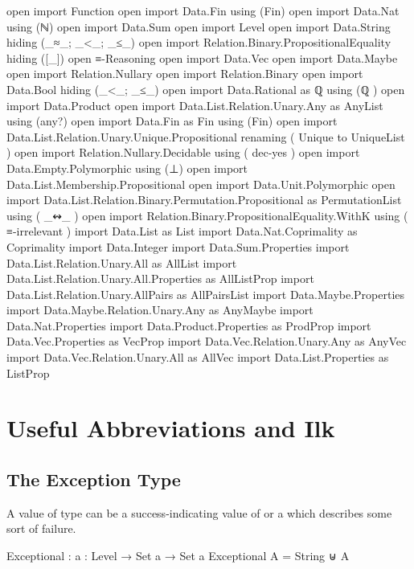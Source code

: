 \documentclass{report}
\begin{document}
\begin{code}
open import Function
open import Data.Fin using (Fin)
open import Data.Nat using (ℕ)
open import Data.Sum
open import Level
open import Data.String hiding (_≈_; _<_; _≤_)
open import Relation.Binary.PropositionalEquality hiding ([_])
open ≡-Reasoning
open import Data.Vec
open import Data.Maybe
open import Relation.Nullary
open import Relation.Binary
open import Data.Bool hiding (_<_; _≤_)
open import Data.Rational
  as ℚ
  using (ℚ
        )
open import Data.Product
open import Data.List.Relation.Unary.Any as AnyList using (any?)
open import Data.Fin as Fin using (Fin)
open import Data.List.Relation.Unary.Unique.Propositional
  renaming
    ( Unique to UniqueList
    )
open import Relation.Nullary.Decidable
  using
    ( dec-yes
    )
open import Data.Empty.Polymorphic using (⊥)
open import Data.List.Membership.Propositional
open import Data.Unit.Polymorphic
open import Data.List.Relation.Binary.Permutation.Propositional
  as PermutationList
  using
    ( _↭_
    )
open import Relation.Binary.PropositionalEquality.WithK
  using
    ( ≡-irrelevant
    )
import Data.List as List
import Data.Nat.Coprimality as Coprimality
import Data.Integer
import Data.Sum.Properties
import Data.List.Relation.Unary.All as AllList
import Data.List.Relation.Unary.All.Properties as AllListProp
import Data.List.Relation.Unary.AllPairs as AllPairsList
import Data.Maybe.Properties
import Data.Maybe.Relation.Unary.Any as AnyMaybe
import Data.Nat.Properties
import Data.Product.Properties as ProdProp
import Data.Vec.Properties as VecProp
import Data.Vec.Relation.Unary.Any as AnyVec
import Data.Vec.Relation.Unary.All as AllVec
import Data.List.Properties as ListProp
\end{code}

\chapter{Useful Abbreviations and Ilk}

\section{The Exception Type}
A value of type   can be a success-indicating value of  or a  which describes some sort of failure.

\begin{code}
Exceptional : {a : Level} → Set a → Set a
Exceptional A = String ⊎ A
\end{code}
\end{document}
